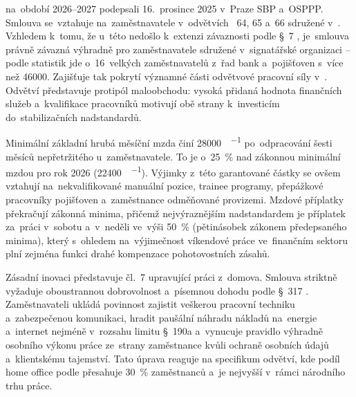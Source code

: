 
na~období 2026--2027 podepsali 16.~prosince 2025 v~Praze \acf{SBP} a~\acf{OSPPP}. Smlouva se~vztahuje na~zaměstnavatele v~odvětvích ~64, 65 a~66 sdružené v~. Vzhledem k~tomu, že u~této  nedošlo k~extenzi závaznosti podle \S~7 , je~smlouva právně závazná výhradně pro zaměstnavatele sdružené v~signatářské organizaci -- podle statistik  jde o~16~velkých zaměstnavatelů z~řad bank a~pojišťoven s~více než \SI{46000}{\person}. Zajišťuje tak pokrytí významné části odvětvové pracovní síly v~. Odvětví představuje protipól maloobchodu: vysoká přidaná hodnota finančních služeb a~kvalifikace pracovníků motivují obě strany k~investicím do~stabilizačních nadstandardů.\par

Minimální základní hrubá měsíční mzda činí \SI{28000}{\czk\per\month} po~odpracování šesti měsíců nepřetržitého  u~zaměstnavatele. To je o~\SI{25}{\percent} nad zákonnou minimální mzdou pro rok 2026 (\SI{22400}{\czk\per\month}). Výjimky z~této garantované částky se ovšem vztahují na~nekvalifikované manuální pozice, trainee programy, přepážkové pracovníky pojišťoven a~zaměstnance odměňované provizemi. Mzdové příplatky překračují zákonná minima, přičemž nejvýraznějším nadstandardem je příplatek za~práci v~sobotu a~v~neděli ve~výši \SI{50}{\percent}  (pětinásobek zákonem předepsaného minima), který s~ohledem na~výjimečnost víkendové práce ve~finančním sektoru plní zejména funkci drahé kompenzace pohotovostních zásahů.\par

Zásadní inovaci představuje čl.~7 upravující práci z~domova. Smlouva striktně vyžaduje oboustrannou dobrovolnost a~písemnou dohodu podle \S~317 . Zaměstnavateli ukládá povinnost zajistit veškerou pracovní techniku a~zabezpečenou komunikaci, hradit paušální náhradu nákladů na~energie a~internet nejméně v~rozsahu limitu \S~190a  a~vynucuje pravidlo výhradně osobního výkonu práce ze~strany zaměstnance kvůli ochraně osobních údajů a~klientskému tajemství. Tato úprava reaguje na specifikum odvětví, kde podíl home office podle  přesahuje \SI{30}{\percent} zaměstnanců a~je nejvyšší v~rámci národního trhu práce.\par

